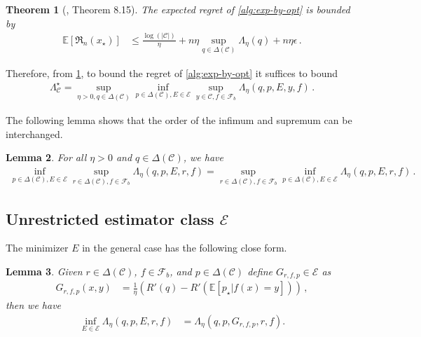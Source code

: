 \documentclass{article}
\theoremstyle{plain}
\newtheorem{theorem}{Theorem}
\newtheorem{lemma}[theorem]{Lemma}
\theoremstyle{definition}
\theoremstyle{remark}
\newcommand{\Reg}{\mathfrak{R}}
\newcommand{\E}{\mathbb E}
\newcommand{\cE}{\mathcal E}
\newcommand{\cF}{\mathcal F}
\newcommand{\cC}{\mathcal C}
\theoremstyle{definition}
\begin{document}
\begin{theorem}[\cite{lattimore2024bandit}, Theorem 8.15] \label{thm:exp-by-opt-regret}
    The expected regret of \cref{alg:exp-by-opt} is bounded by
    \begin{align*}
        \E\left[
            \Reg_n(x_\star)
            \right]
         & \leq
        \frac{\log(|\cC|)}{\eta}
        +
        n\eta \sup_{q \in \Delta(\cC)} \Lambda_\eta(q) + n\eta\epsilon\,.
    \end{align*}
\end{theorem}

Therefore, from \cref{thm:exp-by-opt-regret}, to bound the regret of \cref{alg:exp-by-opt} it suffices to bound
\begin{align*}
    \Lambda^\star_\cC =
    \sup_{\eta > 0, q \in \Delta(\cC)}
    \inf_{p \in \Delta(\cC), E \in \cE}
    \sup_{y \in \cC, f \in \cF_b}
    \Lambda_\eta(q, p, E, y, f)\,.
    \label{eq:exp-by-opt-saddle}
\end{align*}

The following lemma shows that the order of the infimum and supremum can be interchanged.
\begin{lemma}
    For all $\eta > 0$ and $q \in \Delta(\cC)$,  we have
    \begin{align}
        \inf_{p \in \Delta(\cC), E \in \cE}
        \sup_{r \in \Delta(\cC), f \in \cF_b}
        \Lambda_\eta(q, p, E, r, f)
        =
        \sup_{r \in \Delta(\cC), f \in \cF_b}
        \inf_{p \in \Delta(\cC), E \in \cE}
        \Lambda_\eta(q, p, E, r, f)\,.
    \end{align}
\end{lemma}

\subsection{Unrestricted estimator class $\cE$}
The minimizer $E$ in the general case has the following close form.
\begin{lemma}
    Given $r \in \Delta(\cC)$, $f \in \cF_b$, and $p \in \Delta(\cC)$
    define $G_{r, f, p} \in \cE$ as
    \begin{align}
        G_{r, f, p}(x, y) & =
        \frac{1}{\eta}\left(
        R'(q) - R'(\E[p_\star|f(x) = y])
        \right)\,,
    \end{align}
    then we have
    \begin{align*}
        \inf_{E \in \cE}
        \Lambda_\eta(q, p, E, r, f)
         & =
        \Lambda_\eta(q, p, G_{r, f, p}, r, f).
    \end{align*}
\end{lemma}
\end{document}
